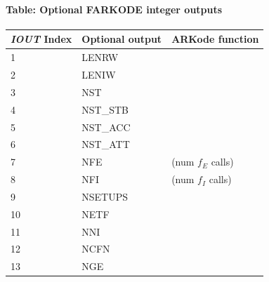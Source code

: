 \documentclass[letterpaper,10pt,english]{sphinxmanual}
\begin{document}
\paragraph{Table: Optional FARKODE integer outputs}
\label{f_interface/Optional_output:table-optional-farkode-integer-outputs}\label{f_interface/Optional_output:finterface-iouttable}
\begin{tabulary}{\linewidth}{|L|L|L|}
\hline
\textbf{
\emph{IOUT} Index
} & \textbf{
Optional output
} & \textbf{
ARKode function
}\\\hline

1
 & 
LENRW
 & 
{\hyperref[c_interface/User_callable:ARKodeGetWorkSpace]{}}
\\\hline

2
 & 
LENIW
 & 
{\hyperref[c_interface/User_callable:ARKodeGetWorkSpace]{}}
\\\hline

3
 & 
NST
 & 
{\hyperref[c_interface/User_callable:ARKodeGetNumSteps]{}}
\\\hline

4
 & 
NST\_STB
 & 
{\hyperref[c_interface/User_callable:ARKodeGetNumExpSteps]{}}
\\\hline

5
 & 
NST\_ACC
 & 
{\hyperref[c_interface/User_callable:ARKodeGetNumAccSteps]{}}
\\\hline

6
 & 
NST\_ATT
 & 
{\hyperref[c_interface/User_callable:ARKodeGetNumStepAttempts]{}}
\\\hline

7
 & 
NFE
 & 
{\hyperref[c_interface/User_callable:ARKodeGetNumRhsEvals]{}} (num $f_E$ calls)
\\\hline

8
 & 
NFI
 & 
{\hyperref[c_interface/User_callable:ARKodeGetNumRhsEvals]{}} (num $f_I$ calls)
\\\hline

9
 & 
NSETUPS
 & 
{\hyperref[c_interface/User_callable:ARKodeGetNumLinSolvSetups]{}}
\\\hline

10
 & 
NETF
 & 
{\hyperref[c_interface/User_callable:ARKodeGetNumErrTestFails]{}}
\\\hline

11
 & 
NNI
 & 
{\hyperref[c_interface/User_callable:ARKodeGetNumNonlinSolvIters]{}}
\\\hline

12
 & 
NCFN
 & 
{\hyperref[c_interface/User_callable:ARKodeGetNumNonlinSolvConvFails]{}}
\\\hline

13
 & 
NGE
 & 
{\hyperref[c_interface/User_callable:ARKodeGetNumGEvals]{}}
\\\hline
\end{tabulary}
\end{document}
